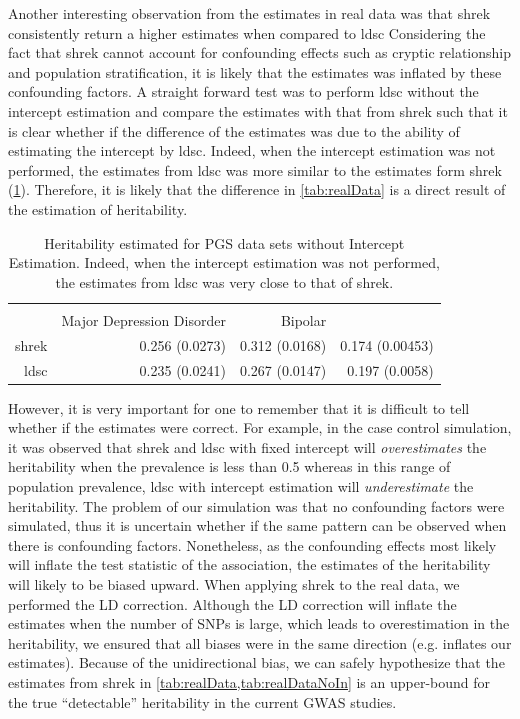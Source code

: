 	Another interesting observation from the estimates in real data was that \gls{shrek} consistently return a higher estimates when compared to \gls{ldsc}
	Considering the fact that \gls{shrek} cannot account for confounding effects such as cryptic relationship and population stratification, it is likely that the estimates was inflated by these confounding factors.
	A straight forward test was to perform \gls{ldsc} without the intercept estimation and compare the estimates with that from \gls{shrek} such that it is clear whether if the difference of the estimates was due to the ability of estimating the intercept by \gls{ldsc}.
	Indeed, when the intercept estimation was not performed, the estimates from \gls{ldsc} was more similar to the estimates form \gls{shrek} (\cref{tab:realDataNoIn}).
	Therefore, it is likely that the difference in \cref{tab:realData} is a direct result of the estimation of heritability.
	 \begin{table}
	 	\centering
	 	\begin{tabular}{rrrr}
	 		\toprule
	 		\\
	 		& Major Depression Disorder & Bipolar & \Glng{scz}\\
	 		\midrule
	 		\gls{shrek}   & 0.256 (0.0273)  & 0.312 (0.0168)  & 0.174 (0.00453) \\
	 		\gls{ldsc}   & 0.235 (0.0241) & 0.267 (0.0147) & 0.197 (0.0058)\\
	 		\bottomrule
	 	\end{tabular}
	 	\caption[Heritability Estimated for PGC Data Sets without Intercept Estimation]{			
	 		Heritability estimated for \gls{PGS} data sets without Intercept Estimation.
	 		Indeed, when the intercept estimation was not performed, the estimates from \gls{ldsc} was very close to that of \gls{shrek}. 
	 	}
	 	\label{tab:realDataNoIn}
	 \end{table}
	 
	However, it is very important for one to remember that it is difficult to tell whether if the estimates were correct.
	For example, in the case control simulation, it was observed that \gls{shrek} and \gls{ldsc} with fixed intercept will \emph{overestimates} the heritability when the prevalence is less than 0.5 whereas in this range of population prevalence, \gls{ldsc} with intercept estimation will \emph{underestimate} the heritability.
	The problem of our simulation was that no confounding factors were simulated, thus it is uncertain whether if the same pattern can be observed when there is confounding factors.
	Nonetheless, as the confounding effects most likely will inflate the test statistic of the association, the estimates of the heritability will likely to be biased upward.
	When applying \gls{shrek} to the real data, we performed the \gls{LD} correction.
	Although the \gls{LD} correction will inflate the estimates when the number of \glspl{SNP} is large, which leads to overestimation in the heritability, we ensured that all biases were in the same direction (e.g. inflates our estimates).
	Because of the unidirectional bias, we can safely hypothesize that the estimates from \gls{shrek} in \cref{tab:realData,tab:realDataNoIn} is an upper-bound for the true ``detectable'' heritability in the current \gls{GWAS} studies.
	

